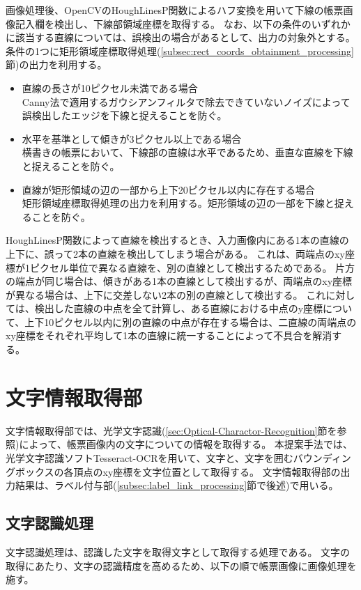 画像処理後、OpenCVのHoughLinesP関数によるハフ変換を用いて下線の帳票画像記入欄を検出し、下線部領域座標を取得する。
なお、以下の条件のいずれかに該当する直線については、誤検出の場合があるとして、出力の対象外とする。
条件の1つに矩形領域座標取得処理(\ref{subsec:rect_coords_obtainment_processing}節)の出力を利用する。

\begin{itemize}
    \item 直線の長さが10ピクセル未満である場合\\
        Canny法で適用するガウシアンフィルタで除去できていないノイズによって誤検出したエッジを下線と捉えることを防ぐ。
    \item 水平を基準として傾きが3ピクセル以上である場合\\
        横書きの帳票において、下線部の直線は水平であるため、垂直な直線を下線と捉えることを防ぐ。
    \item 直線が矩形領域の辺の一部から上下20ピクセル以内に存在する場合\\
        矩形領域座標取得処理の出力を利用する。矩形領域の辺の一部を下線と捉えることを防ぐ。
\end{itemize}

HoughLinesP関数によって直線を検出するとき、入力画像内にある1本の直線の上下に、誤って2本の直線を検出してしまう場合がある。
これは、両端点のxy座標が1ピクセル単位で異なる直線を、別の直線として検出するためである。
片方の端点が同じ場合は、傾きがある1本の直線として検出するが、両端点のxy座標が異なる場合は、上下に交差しない2本の別の直線として検出する。
これに対しては、検出した直線の中点を全て計算し、ある直線における中点のy座標について、上下10ピクセル以内に別の直線の中点が存在する場合は、二直線の両端点のxy座標をそれぞれ平均して1本の直線に統一することによって不具合を解消する。

\section{文字情報取得部}\label{sec:OCR_part}
文字情報取得部では、光学文字認識(\ref{sec:Optical-Charactor-Recognition}節を参照)によって、帳票画像内の文字についての情報を取得する。
本提案手法では、光学文字認識ソフトTesseract-OCRを用いて、文字と、文字を囲むバウンディングボックスの各頂点のxy座標を文字位置として取得する。
文字情報取得部の出力結果は、ラベル付与部(\ref{subsec:label_link_processing}節で後述)で用いる。

\subsection{文字認識処理}\label{subsec:char_recognition_processing}
文字認識処理は、認識した文字を取得文字として取得する処理である。
文字の取得にあたり、文字の認識精度を高めるため、以下の順で帳票画像に画像処理を施す。

